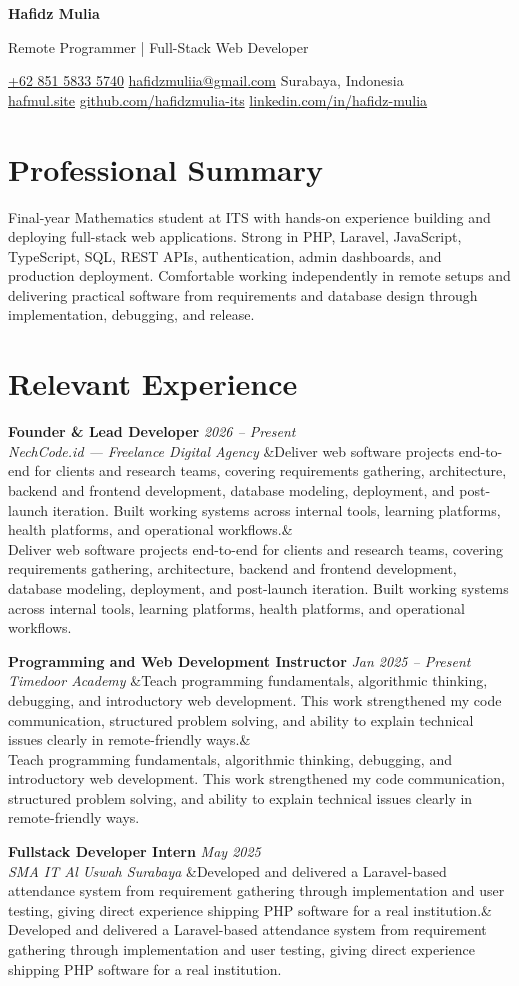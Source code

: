 \documentclass[a4paper,11pt]{article}
\newcommand{\cvname}[1]{%
  {\centering\LARGE\bfseries #1\par\vspace{2pt}}%
}
\newcommand{\cvtitle}[1]{%
  {\centering\large\color{accent} #1\par\vspace{4pt}}%
}
\newcommand{\cvcontact}[1]{%
  {\centering\small #1\par\vspace{6pt}}%
}
\newcommand{\cventry}[4]{%
  \noindent\textbf{#1} \hfill \textit{#3} \\
  \textit{#2}
  \ifx&#4& \else \\ \small #4 \fi
  \vspace{6pt}
}
\begin{document}
\cvname{Hafidz Mulia}
\cvtitle{Remote Programmer | Full-Stack Web Developer}
\cvcontact{%
  \href{tel:+6285158335740}{+62 851 5833 5740} \quad\textbar\quad
  \href{mailto:hafidzmuliia@gmail.com}{hafidzmuliia@gmail.com} \quad\textbar\quad
  Surabaya, Indonesia \\
  \href{https://hafmul.site}{hafmul.site} \quad\textbar\quad
  \href{https://github.com/hafidzmulia-its}{github.com/hafidzmulia-its} \quad\textbar\quad
  \href{https://www.linkedin.com/in/hafidz-mulia/}{linkedin.com/in/hafidz-mulia}
}

\section{Professional Summary}
Final-year Mathematics student at ITS with hands-on experience building and deploying full-stack web applications. Strong in PHP, Laravel, JavaScript, TypeScript, SQL, REST APIs, authentication, admin dashboards, and production deployment. Comfortable working independently in remote setups and delivering practical software from requirements and database design through implementation, debugging, and release.

\section{Relevant Experience}
\cventry
  {Founder \& Lead Developer}
  {NechCode.id --- Freelance Digital Agency}
  {2026 -- Present}
  {Deliver web software projects end-to-end for clients and research teams, covering requirements gathering, architecture, backend and frontend development, database modeling, deployment, and post-launch iteration. Built working systems across internal tools, learning platforms, health platforms, and operational workflows.}

\cventry
  {Programming and Web Development Instructor}
  {Timedoor Academy}
  {Jan 2025 -- Present}
  {Teach programming fundamentals, algorithmic thinking, debugging, and introductory web development. This work strengthened my code communication, structured problem solving, and ability to explain technical issues clearly in remote-friendly ways.}

\cventry
  {Fullstack Developer Intern}
  {SMA IT Al Uswah Surabaya}
  {May 2025}
  {Developed and delivered a Laravel-based attendance system from requirement gathering through implementation and user testing, giving direct experience shipping PHP software for a real institution.}
\end{document}
